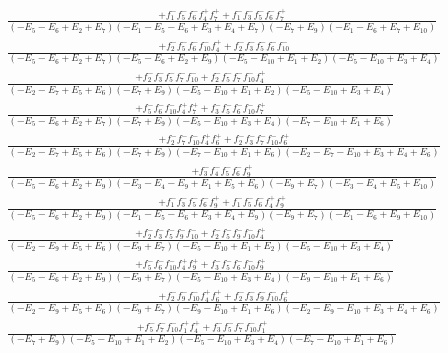 \documentclass{article}
\begin{document}
\[\begin{array}{rcl}
\frac{+f_{1}^{-}f_{5}^{-}f_{6}^{-}f_{4}^{+}f_{7}^{+}+f_{1}^{-}f_{3}^{-}f_{5}^{-}f_{6}^{-}f_{7}^{+}}{(-E_{5}-E_{6}+E_{2}+E_{7})(-E_{1}-E_{5}-E_{6}+E_{3}+E_{4}+E_{7})(-E_{7}+E_{9})(-E_{1}-E_{6}+E_{7}+E_{10})}\\
\frac{+f_{2}^{-}f_{5}^{-}f_{6}^{-}f_{10}^{-}f_{4}^{+}+f_{2}^{-}f_{3}^{-}f_{5}^{-}f_{6}^{-}f_{10}^{-}}{(-E_{5}-E_{6}+E_{2}+E_{7})(-E_{5}-E_{6}+E_{2}+E_{9})(-E_{5}-E_{10}+E_{1}+E_{2})(-E_{5}-E_{10}+E_{3}+E_{4})}\\
\frac{+f_{2}^{-}f_{3}^{-}f_{5}^{-}f_{7}^{-}f_{10}^{-}+f_{2}^{-}f_{5}^{-}f_{7}^{-}f_{10}^{-}f_{4}^{+}}{(-E_{2}-E_{7}+E_{5}+E_{6})(-E_{7}+E_{9})(-E_{5}-E_{10}+E_{1}+E_{2})(-E_{5}-E_{10}+E_{3}+E_{4})}\\
\frac{+f_{5}^{-}f_{6}^{-}f_{10}^{-}f_{4}^{+}f_{7}^{+}+f_{3}^{-}f_{5}^{-}f_{6}^{-}f_{10}^{-}f_{7}^{+}}{(-E_{5}-E_{6}+E_{2}+E_{7})(-E_{7}+E_{9})(-E_{5}-E_{10}+E_{3}+E_{4})(-E_{7}-E_{10}+E_{1}+E_{6})}\\
\frac{+f_{2}^{-}f_{7}^{-}f_{10}^{-}f_{4}^{+}f_{6}^{+}+f_{2}^{-}f_{3}^{-}f_{7}^{-}f_{10}^{-}f_{6}^{+}}{(-E_{2}-E_{7}+E_{5}+E_{6})(-E_{7}+E_{9})(-E_{7}-E_{10}+E_{1}+E_{6})(-E_{2}-E_{7}-E_{10}+E_{3}+E_{4}+E_{6})}\\
\frac{+f_{3}^{-}f_{4}^{-}f_{5}^{-}f_{6}^{-}f_{9}^{+}}{(-E_{5}-E_{6}+E_{2}+E_{9})(-E_{3}-E_{4}-E_{9}+E_{1}+E_{5}+E_{6})(-E_{9}+E_{7})(-E_{3}-E_{4}+E_{5}+E_{10})}\\
\frac{+f_{1}^{-}f_{3}^{-}f_{5}^{-}f_{6}^{-}f_{9}^{+}+f_{1}^{-}f_{5}^{-}f_{6}^{-}f_{4}^{+}f_{9}^{+}}{(-E_{5}-E_{6}+E_{2}+E_{9})(-E_{1}-E_{5}-E_{6}+E_{3}+E_{4}+E_{9})(-E_{9}+E_{7})(-E_{1}-E_{6}+E_{9}+E_{10})}\\
\frac{+f_{2}^{-}f_{3}^{-}f_{5}^{-}f_{9}^{-}f_{10}^{-}+f_{2}^{-}f_{5}^{-}f_{9}^{-}f_{10}^{-}f_{4}^{+}}{(-E_{2}-E_{9}+E_{5}+E_{6})(-E_{9}+E_{7})(-E_{5}-E_{10}+E_{1}+E_{2})(-E_{5}-E_{10}+E_{3}+E_{4})}\\
\frac{+f_{5}^{-}f_{6}^{-}f_{10}^{-}f_{4}^{+}f_{9}^{+}+f_{3}^{-}f_{5}^{-}f_{6}^{-}f_{10}^{-}f_{9}^{+}}{(-E_{5}-E_{6}+E_{2}+E_{9})(-E_{9}+E_{7})(-E_{5}-E_{10}+E_{3}+E_{4})(-E_{9}-E_{10}+E_{1}+E_{6})}\\
\frac{+f_{2}^{-}f_{9}^{-}f_{10}^{-}f_{4}^{+}f_{6}^{+}+f_{2}^{-}f_{3}^{-}f_{9}^{-}f_{10}^{-}f_{6}^{+}}{(-E_{2}-E_{9}+E_{5}+E_{6})(-E_{9}+E_{7})(-E_{9}-E_{10}+E_{1}+E_{6})(-E_{2}-E_{9}-E_{10}+E_{3}+E_{4}+E_{6})}\\
\frac{+f_{5}^{-}f_{7}^{-}f_{10}^{-}f_{1}^{+}f_{4}^{+}+f_{3}^{-}f_{5}^{-}f_{7}^{-}f_{10}^{-}f_{1}^{+}}{(-E_{7}+E_{9})(-E_{5}-E_{10}+E_{1}+E_{2})(-E_{5}-E_{10}+E_{3}+E_{4})(-E_{7}-E_{10}+E_{1}+E_{6})}\\

\end{array}\]
\end{document}
